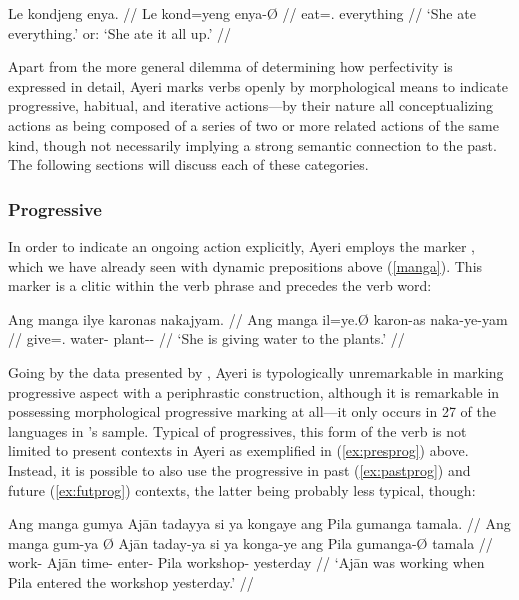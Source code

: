 \ex\begingl
	\gla Le kondjeng enya. //
	\glb Le kond=yeng enya-Ø //
	\glc \PatTI{} eat=\TsgF{}.\Aarg{} everything //
	\glft `She ate everything.' or: `She ate it all up.' //
\endgl\xe

Apart from the more general dilemma of determining how perfectivity is
expressed in detail, Ayeri marks verbs openly by morphological means to
indicate progressive, habitual, and iterative actions---by their nature all
conceptualizing actions as being composed of a series of two or more related
actions of the same kind, though not necessarily implying a strong semantic
connection to the past. The following sections will discuss each of these
categories.

\subsubsection{Progressive}

In order to indicate an ongoing action explicitly, Ayeri employs the marker 
, which we have already seen with dynamic prepositions above 
(\autoref{manga}). This marker is a clitic within the verb phrase and 
precedes the verb word:

\ex\label{ex:presprog}\begingl
	\gla Ang manga ilye karonas nakajyam. //
	\glb Ang manga il=ye.Ø karon-as naka-ye-yam //
	\glc \AgtT{} \Prog{} give=\TsgF{}.\Top{} water-\Parg{} 
		plant-\Pl{}-\Dat{} //
	\glft `She is giving water to the plants.' //
\endgl\xe

Going by the data presented by \citet[91]{dahl1985}, Ayeri is typologically
unremarkable in marking progressive aspect with a periphrastic construction,
although it is remarkable in possessing morphological progressive marking at
all---it only occurs in 27\pct{} of the languages in \citet{dahl1985}'s
sample. Typical of progressives, this form of the verb is not limited to
present contexts in Ayeri as exemplified in (\ref{ex:presprog}) above. Instead,
it is possible to also use the progressive in past (\ref{ex:pastprog}) and
future (\ref{ex:futprog}) contexts, the latter being probably less typical,
though:

\pex\label{ex:nonpresprog}
\a\label{ex:pastprog}\begingl
	\gla Ang manga gumya {} Ajān tadayya si ya kongaye ang Pila gumanga 
		tamala. //
	\glb Ang manga gum-ya Ø Ajān taday-ya si ya konga-ye ang Pila 
		gumanga-Ø tamala //
	\glc \AgtT{} \Prog{} work-\Tsg{} \Top{} Ajān time-\Loc{} \Rel{} \LocT{} 
		enter-\TsgF{} \Aarg{} Pila workshop-\Top{} yesterday //
	\glft `Ajān was working when Pila entered the workshop yesterday.' //
\endgl

